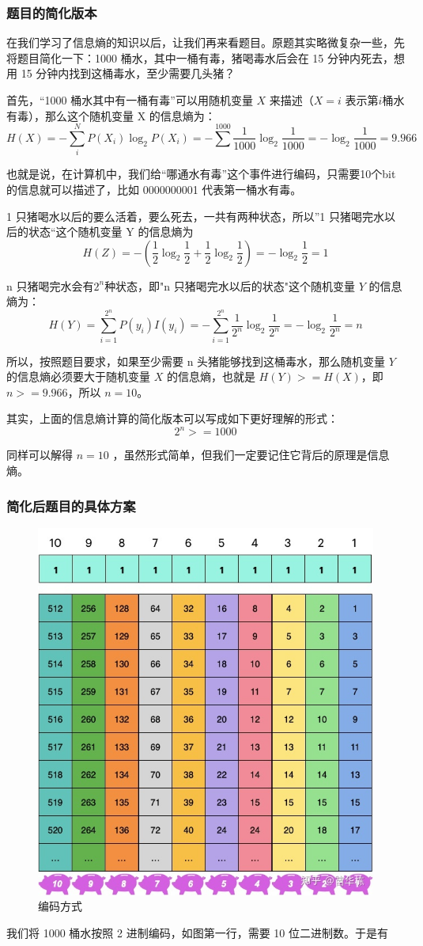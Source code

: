 \documentclass[12pt]{article}
\begin{document}
\subsubsection{题目的简化版本}

在我们学习了信息熵的知识以后，让我们再来看题目。原题其实略微复杂一些，先将题目简化一下：1000 桶水，其中一桶有毒，猪喝毒水后会在 15 分钟内死去，想用 15 分钟内找到这桶毒水，至少需要几头猪？

首先，“1000 桶水其中有一桶有毒”可以用随机变量 $X$ 来描述（$X=i$ 表示第$i$桶水有毒），那么这个随机变量 X 的信息熵为：
$$
H(X) = -\sum_i^{N}P(X_i)\log_2{P(X_i)} = -\sum^{1000}\frac{1}{1000}\log_2{\frac{1}{1000 }} = -\log_2{\frac{1}{1000}} = 9.966
$$

也就是说，在计算机中，我们给“哪通水有毒”这个事件进行编码，只需要10个bit的信息就可以描述了，比如 0000000001 代表第一桶水有毒。

1 只猪喝水以后的要么活着，要么死去，一共有两种状态，所以”1 只猪喝完水以后的状态“这个随机变量 Y 的信息熵为
$$H(Z) = -(\frac{1}{2}\log_2{\frac{1}{2}}+\frac{1}{2}\log_2{\frac{1}{2}}) = -\log_2{\frac{1}{2}} = 1$$

n 只猪喝完水会有$2^n$种状态，即"n 只猪喝完水以后的状态"这个随机变量 $Y$ 的信息熵为：
$$H(Y) = \sum_{i=1}^{2^n}P(y_i)I(y_i)=-\sum_{i=1}^{2^n}\frac{1}{2^n}\log_2{\frac{1}{2^n}} = -\log_2{\frac{1}{2^n}} = n$$

所以，按照题目要求，如果至少需要 n 头猪能够找到这桶毒水，那么随机变量 $Y$ 的信息熵必须要大于随机变量 $X$ 的信息熵，也就是 $H(Y)>=H(X)$，即$n>=9.966$，所以 $n=10$。

其实，上面的信息熵计算的简化版本可以写成如下更好理解的形式：
$$2^n>=1000$$

同样可以解得 $n = 10$ ，虽然形式简单，但我们一定要记住它背后的原理是信息熵。

\subsubsection{简化后题目的具体方案}
\begin{figure}[ht]
  \centering
  \includegraphics[width=.5\textwidth]{fig/InfomationTheory_Poison_Encode.jpg} %
  \caption{编码方式} %
  \label{InfomationTheory_Poison_Encode} %
\end{figure}
我们将 1000 桶水按照 2 进制编码，如图第一行，需要 10 位二进制数。于是有
\end{document}
